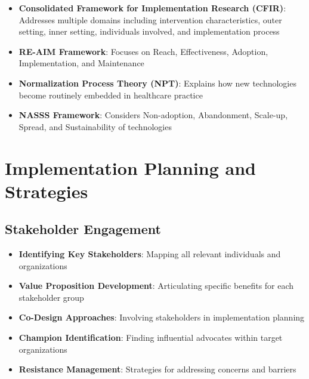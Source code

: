 \begin{itemize}
    \item \textbf{Consolidated Framework for Implementation Research (CFIR)}: Addresses multiple domains including intervention characteristics, outer setting, inner setting, individuals involved, and implementation process
    
    \item \textbf{RE-AIM Framework}: Focuses on Reach, Effectiveness, Adoption, Implementation, and Maintenance
    
    \item \textbf{Normalization Process Theory (NPT)}: Explains how new technologies become routinely embedded in healthcare practice
    
    \item \textbf{NASSS Framework}: Considers Non-adoption, Abandonment, Scale-up, Spread, and Sustainability of technologies
\end{itemize}

\section{Implementation Planning and Strategies}
\subsection{Stakeholder Engagement}
\begin{itemize}
    \item \textbf{Identifying Key Stakeholders}: Mapping all relevant individuals and organizations
    
    \item \textbf{Value Proposition Development}: Articulating specific benefits for each stakeholder group
    
    \item \textbf{Co-Design Approaches}: Involving stakeholders in implementation planning
    
    \item \textbf{Champion Identification}: Finding influential advocates within target organizations
    
    \item \textbf{Resistance Management}: Strategies for addressing concerns and barriers
\end{itemize}

